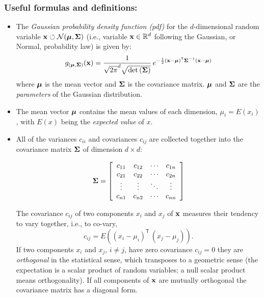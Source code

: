 \documentclass[a4paper]{article}
\newcommand{\trn}{^{\mathsf T}} %
\newcommand{\xv}{\ensuremath\mathbf{x}}  %
\newcommand{\muv}{\ensuremath\boldsymbol{\mu}}  %
\newcommand{\Sm}{\ensuremath\boldsymbol{\Sigma}}  %
\newcommand{\Rf}{\ensuremath\mathbb{R}}
\begin{document}
\subsubsection*{Useful formulas and definitions:}\label{sec:gausspdf}
\begin{itemize}
  
\item The {\em Gaussian probability density function (pdf)} for the
  $d$-dimensional random variable $\xv \circlearrowleft {\cal
    N}(\muv,\Sm)$ (i.e., variable $\xv \in \Rf^d$ following the
  Gaussian, or Normal, probability law) is given by:
  \begin{equation}
    \label{eq:gauss}
    g_{(\muv,\Sm)}(\xv) = \frac{1}{\sqrt{2\pi}^d
      \sqrt{\det\left(\Sm\right)}} \, e^{-\frac{1}{2} (\xv-\muv)\trn
      \Sm^{-1} (\xv-\muv)}
  \end{equation}
  where $\muv$ is the mean vector and $\Sm$ is the covariance matrix.
  $\muv$ and $\Sm$ are the {\em parameters} of the Gaussian
  distribution.
  
\item The mean vector $\muv$ contains the mean values of each
  dimension, $\mu_i = E(x_i)$, with $E(x)$ being the \emph{expected
    value} of $x$.
  
\item All of the variances $c_{ii}$ and covariances $c_{ij}$ are
  collected together into the covariance matrix $\Sm$ of dimension
  $d\times d$:

\begin{equation*}
  \Sm =
  \left[
    \begin{array}{*{4}{c}}
      c_{11} & c_{12} & \cdots & c_{1n} \\
      c_{21} & c_{22} & \cdots & c_{2n} \\
      \vdots & \vdots & \ddots & \vdots \\
      c_{n1} & c_{n2} & \cdots & c_{nn} \\
    \end{array}
  \right]
\end{equation*}

The covariance $c_{ij}$ of two components $x_i$ and $x_j$ of $\xv$
measures their tendency to vary together, i.e., to co-vary,
\[ c_{ij} = E\left((x_i-\mu_i)\trn\,(x_j-\mu_j)\right).\]
If two components $x_i$ and $x_j$, $i\ne j$, have zero covariance
$c_{ij} = 0$ they are {\em orthogonal} in the statistical sense, which
transposes to a geometric sense (the expectation is a scalar product
of random variables; a null scalar product means orthogonality).  If
all components of $\xv$ are mutually orthogonal the covariance matrix
has a diagonal form.



\end{itemize}
\end{document}
